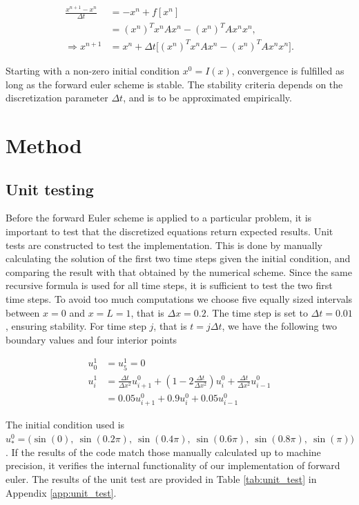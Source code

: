 \documentclass[12pt]{extarticle}
\begin{document}
\begin{align}
	\frac{x^{n+1}-x^n}{\Delta t} &= -x^n + f[x^n] \nonumber \\
	&= (x^n)^T x^n A x^n - (x^n)^T A x^n x^n, \\
	\Rightarrow x^{n+1} &= x^n + \Delta t\big[ (x^n)^T x^n A x^n - (x^n)^T A x^n x^n \big].
\end{align}

Starting with a non-zero initial condition $x^0 = I(x)$, convergence is fulfilled as long as the forward euler scheme is stable. The stability criteria depends on the discretization parameter $\Delta t$, and is to be approximated empirically. 



\section{Method}
\subsection{Unit testing}

Before the forward Euler scheme is applied to a particular problem, it is important to test that the discretized equations return expected results. Unit tests are constructed to test the implementation. This is done by manually calculating the solution of the first two time steps given the initial condition, and comparing the result with that obtained by the numerical scheme. Since the same recursive formula is used for all time steps, it is sufficient to test the two first time steps. To avoid too much computations we choose five equally sized intervals between $x=0$ and $x=L=1$, that is $\Delta x = 0.2$. The time step is set to $\Delta t = 0.01$, ensuring stability.
For time step $j$, that is $t=j\Delta t$, we have the following two boundary values and four interior points

\begin{align*}
	u_0^1 &= u_5^1 = 0 \\
	u_i^1 &= \frac{\Delta t}{\Delta x^2}u_{i+1}^0 + (1 - 2\frac{\Delta t}{\Delta x^2})u_i^0 + \frac{\Delta t}{\Delta x^2}u_{i-1}^0 \\
	&= 0.05u_{i+1}^0 + 0.9u_i^0 + 0.05u_{i-1}^0
\end{align*}

The initial condition used is $u_*^0 = \big(\sin(0),\:\sin(0.2\pi),\:\sin(0.4\pi),\:\sin(0.6\pi), \:\sin(0.8\pi),\:\sin(\pi)\big)$. If the results of the code match those manually calculated up to machine precision, it verifies the internal functionality of our implementation of forward euler. The results of the unit test are provided in Table \ref{tab:unit_test} in Appendix \ref{app:unit_test}.
\end{document}
